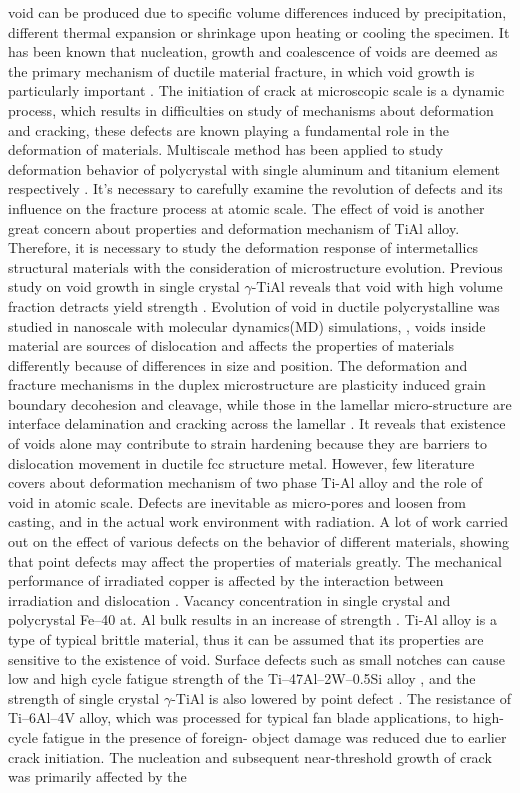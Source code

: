 \documentclass[Unknown,article,submit,moreauthors,pdftex,10pt,a4paper]{Definitions/mdpi}
\begin{document}
void can be produced due to specific volume differences induced by precipitation, different thermal expansion or shrinkage upon heating or cooling the specimen. It has been known that nucleation, growth and coalescence of voids are deemed as the primary mechanism of ductile material fracture, in which void growth is particularly important \cite{Hempel2017a}. The initiation of crack at microscopic scale is a dynamic process, which results in difficulties on study of mechanisms about deformation and cracking, these defects are known playing a fundamental role in the deformation of materials. Multiscale method has been applied to study deformation behavior of polycrystal with single aluminum \cite{Groh2009} and titanium element respectively \cite{Liu2018}. It's necessary to carefully examine the revolution of defects and its influence on the fracture process at atomic scale. The effect of void is another great concern about properties and deformation mechanism of TiAl alloy.  Therefore, it is necessary to study the deformation response of intermetallics structural materials with the consideration of microstructure evolution. Previous study on void growth in single crystal $\gamma$-TiAl reveals that void with high volume fraction detracts yield strength \cite{Tang2014, Xu2011}. Evolution of void in ductile polycrystalline was studied in nanoscale with molecular dynamics(MD) simulations, \cite{Jing2018a,Elkhateeb2018}, voids inside material are sources of dislocation and affects the properties of materials differently because of differences in size and position.  The deformation and fracture mechanisms in the duplex microstructure are plasticity induced grain boundary decohesion and cleavage, while those in the lamellar micro-structure are interface delamination and cracking across the lamellar \cite{Tang2014}. It reveals that existence of voids alone may contribute to strain hardening because they are barriers to dislocation movement in ductile fcc structure metal\cite{Xiong2015}. However, few literature covers about deformation mechanism of two phase Ti-Al alloy and the role of void in atomic scale. Defects are inevitable as micro-pores and loosen from casting, and in the actual work environment with radiation. A lot of work carried out on the effect of various defects on the behavior of different materials, showing that point defects may affect the properties of materials greatly. The mechanical performance of irradiated copper is affected by the interaction between irradiation and dislocation \cite{Kiener2011}. Vacancy concentration in single crystal and polycrystal Fe–40 at. Al bulk results in an increase of strength \cite{Yang1998}. Ti-Al alloy is a type of typical brittle material, thus it can be assumed that its properties are sensitive to the existence of void. Surface defects such as small notches can cause low and high cycle fatigue strength of the Ti–47Al–2W–0.5Si alloy \cite{Nazmy2001}, and the strength of single crystal $\gamma$-TiAl is also lowered by point defect \cite{Wu2016}. The resistance of Ti–6Al–4V alloy, which was processed for typical fan blade applications, to high-cycle fatigue in the presence of foreign- object damage was reduced due to earlier crack initiation.  The nucleation and subsequent near-threshold growth of crack was primarily affected by the 
\end{document}
